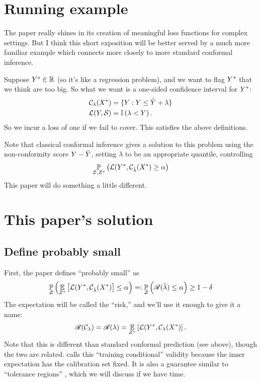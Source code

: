 \documentclass[twoside,11pt]{article}
\numberwithin{equation}{section}
\begin{document}
\section{Running example}

The paper really shines in its creation of meaningful loss functions
for complex settings.  But I think this short exposition will be 
better served by a much more familiar example which connects
more closely to more standard conformal inference.

Suppose $Y^{*} \in \mathbb{R}$ (so it's like a regression problem), and
we want to flag $Y^{*}$ that we think are too big.
So what we want is a one-sided confidence interval for $Y^{*}$:
%
\begin{align*}
%
\cfun_\lambda(\xnew) ={}& \{ \y: \y \le \yhat + \lambda \}\\
\loss(\y, \s) ={}& \ind{\lambda < \y}.
%
\end{align*}
%
So we incur a loss of one if we fail to cover.  This satisfies
the above definitions.  

Note that classical conformal inference gives a solution
to this problem using the non-conformity score $Y - \hat{Y}$,
setting $\lambda$ to be an appropriate quantile,
controlling 
%
\begin{align*}
%
\p{\calset,\znew}{\loss(\ynew, \cfun_{\lambdahat}(\xnew) \ge \alpha}
%
\end{align*}
%
This paper
will do something a little different.


\section{This paper's solution}

\subsection{Define probably small} 
First, the paper defines ``probably small'' as
%
\begin{align*}
%
\p{\calset}{
    \expect{\znew}{\loss(\ynew, \cfun_{\lambdahat}(\xnew)} \le \alpha
} =:
\p{\calset}{\risk(\lambdahat) \le \alpha}
\ge 1 - \delta
%
\end{align*}
%
The expectation will be called the ``risk,'' and we'll use it enough
to give it a name:
%
\begin{align*}
%
\risk(\cfun_\lambda) = \risk(\lambda) =
    \expect{\znew}{\loss(\ynew, \cfun_{\lambda}(\xnew)}.
%
\end{align*}
%
Note that this is different than standard conformal prediction (see above),
though the two are related.  \citet{vovk:2012:conditionalconformal} calls this
``training conditional'' validity because the inner expectation has the
calibration set fixed.  It is also a guarantee similar to ``tolerance regions''
\citep{krishnamoorthy:2009:statisticaltoleranceregions}, which we will discuss
if we have time.
\end{document}
